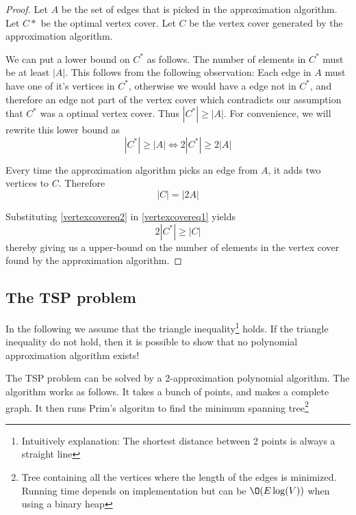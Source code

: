 \documentclass[10pt]{article}
\begin{document}
\begin{proof}
Let $A$ be the set of edges that is picked in the approximation algorithm. Let $C*$ be the optimal vertex cover. Let $C$ be the vertex cover generated by the approximation algorithm. 

We can put a lower bound on $C^*$ as follows. The number of elements in $C^*$ must be at least $|A|$. This follows from the following observation: Each edge in $A$ must have one of it's vertices in $C^*$, otherwise we would have a edge not in $C^*$, and therefore an edge not part of the vertex cover which contradicts our assumption that $C^*$ was a optimal vertex cover. Thus $|C^*| \geq |A|$. For convenience, we will rewrite this lower bound as 
\begin{equation}
|C^*| \geq |A| \Leftrightarrow 2|C^*| \geq 2|A|  \label{vertexcovereq1}
\end{equation}

Every time the approximation algorithm picks an edge from $A$, it adds two vertices to $C$. Therefore 
\begin{equation}
|C| = |2A| \label{vertexcovereq2}   
\end{equation}

Substituting \ref{vertexcovereq2} in \ref{vertexcovereq1} yields
\begin{equation}
2|C^*| \geq |C|
\end{equation}
thereby giving us a upper-bound on the number of elements in the vertex cover found by the approximation algorithm.
\end{proof}



\subsection{The TSP problem} %
\label{sub:the_tsp_problem}
In the following we assume that the triangle inequality\footnote{Intuitively explanation: The shortest distance between 2 points is always a straight line} holds. If the triangle inequality do not hold, then it is possible to show that no polynomial approximation algorithm exists!

The TSP problem can be solved by a 2-approximation polynomial algorithm. The algorithm works as follows. It takes a bunch of points, and makes a complete graph. It then runs Prim's algoritm to find the minimum spanning tree\footnote{Tree containing all the vertices where the length of the edges is minimized. Running time depends on implementation but can be $\O(E\log(V))$ when using a binary heap}
\end{document}

